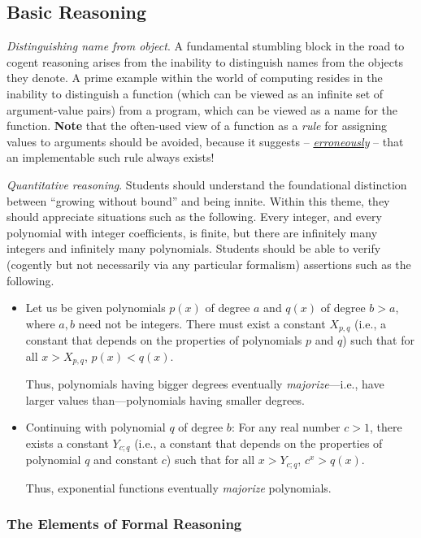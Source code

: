 \subsection{Basic Reasoning}

{\em Distinguishing name from object}.
%
A fundamental stumbling block in the road to cogent reasoning arises
from the inability to distinguish names from the objects they denote.
A prime example within the world of computing resides in the inability
to distinguish a function (which can be viewed as an infinite set of
argument-value pairs) from a program, which can be viewed as a name
for the function.  {\bf Note} that the often-used view of a function
as a {\em rule} for assigning values to arguments should be avoided,
because it suggests -- \underline{\em erroneously} -- that an
implementable such rule always exists!

{\em Quantitative reasoning}.
%
Students should understand the foundational distinction between
``growing without bound'' and being innite.  Within this theme, they
should appreciate situations such as the following.  Every integer,
and every polynomial with integer coefficients, is finite, but there
are infinitely many integers and infinitely many polynomials.
Students should be able to verify (cogently but not necessarily via
any particular formalism) assertions such as the following.
\begin{itemize}
\item
Let us be given polynomials $p(x)$ of degree $a$ and $q(x)$ of degree
$b > a$, where $a, b$ need not be integers.  There must exist a
constant $X_{p,q}$ (i.e., a constant that depends on the properties of
polynomials $p$ and $q$) such that for all $x > X_{p,q}$, $p(x) <
q(x)$.

Thus, polynomials having bigger degrees eventually {\em
  majorize}---i.e., have larger values than---polynomials having
smaller degrees.

\item
Continuing with polynomial $q$ of degree $b$: For any real number $c >
1$, there exists a constant $Y_{c;q}$ (i.e., a constant that depends
on the properties of polynomial $q$ and constant $c$) such that for
all $x > Y_{c;q}$, $c^x > q(x)$.

Thus, exponential functions eventually {\em majorize} polynomials.
\end{itemize}

\subsubsection{The Elements of Formal Reasoning}

